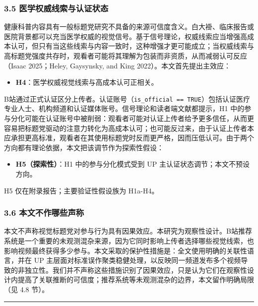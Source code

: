 \documentclass[
  fontset=none]{ctexart}
\providecommand{\tightlist}{%
  \setlength{\itemsep}{0pt}\setlength{\parskip}{0pt}}
\begin{document}
\subsubsection{3.5 医学权威线索与认证状态}\label{ux533bux5b66ux6743ux5a01ux7ebfux7d22ux4e0eux8ba4ux8bc1ux72b6ux6001}

健康科普内容具有一般标题党研究不具备的来源可信度含义。白大褂、临床报告或医院背景都可以充当医学权威的视觉信号。基于信号理论，权威线索应当增强高成本认可，但只有当这些线索与内容一致时，这种增强才更可能成立；当权威线索与高标题党强度共存时，观看者可能将其理解为包装而非资质，从而减弱认可反应 （Isaac 2025；Heley, Gaysynsky, and King 2022）。本文首先提出主效应：

\begin{itemize}
\tightlist
\item
  \textbf{H4}：医学权威视觉线索与高成本认可正相关。
\end{itemize}

B站通过正式认证区分上传者。认证账号（\texttt{is\_official\ ==\ TRUE}）包括认证医疗专业人士、机构频道和认证媒体账号。信号理论和读者端文献都提示，H1 中的参与分化可能在认证账号中被削弱：观看者可能对认证上传者给予更多信任，从而更容易把标题党驱动的注意力转化为高成本认可；也可能反过来，由于认证上传者本应承担更高标准，观看者在其使用标题党时反而更严格，因而压低认可。由于两个方向都有理论依据，本文把该调节作为探索性假设：

\begin{itemize}
\tightlist
\item
  \textbf{H5（探索性）}：H1 中的参与分化模式受到 UP 主认证状态调节；本文不预设方向。
\end{itemize}

H5 仅在附录报告；主要验证性假设族为 H1a-H4。

\subsubsection{3.6 本文不作哪些声称}\label{ux672cux6587ux4e0dux4f5cux54eaux4e9bux58f0ux79f0}

本文不声称视觉标题党对参与行为具有因果效应。本研究为观察性设计。B站推荐系统是一个重要的未观测混杂来源，因为它同时影响上传者选择哪些视觉线索，也影响视频最终获得多少参与。本文采取的保护性措施是：全文使用明确的关联性语言，并在 UP 主层面对标准误作聚类稳健处理，以反映同一频道发布多个视频导致的非独立性。我们并不声称这些措施识别了因果效应，只是认为它们在观察性设计内提高了关联推断的可信度；推荐系统等未观测混杂的边界，本文留作明确局限（见 4.8 节）。

\begin{center}\rule{0.5\linewidth}{0.5pt}\end{center}
\end{document}
